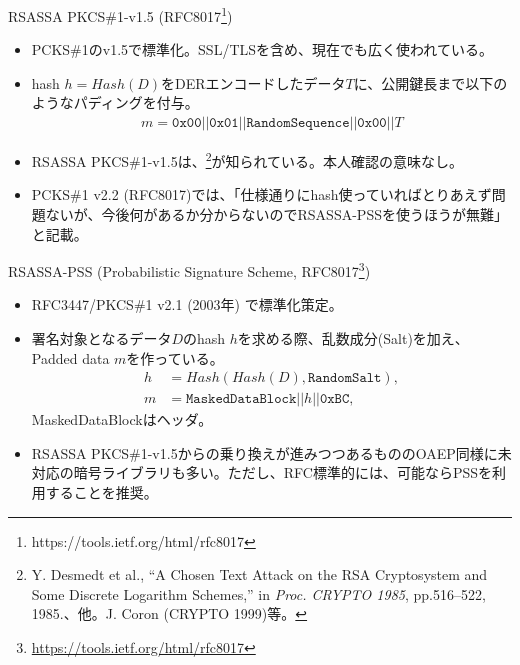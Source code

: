 \documentclass[12pt,dvipdfmx]{beamer}
\begin{document}
\begin{frame}
 \begin{block}{\small RSASSA PKCS\#1-v1.5 (RFC8017\footnote[frame]{\scriptsize https://tools.ietf.org/html/rfc8017})}
\begin{itemize}
 \item {} PCKS\#1のv1.5で標準化。SSL/TLSを含め、現在でも広く使われている。
 \item hash $h = \mathit{Hash}(D)$をDERエンコードしたデータ$T$に、公開鍵長まで以下のようなパディングを付与。
\begin{align*}
m = \mathtt{0x00 || 0x01 || RandomSequence || 0x00 ||} T
\end{align*}
 \item RSASSA PKCS\#1-v1.5は、\footnote[frame]{\scriptsize Y. Desmedt et al., ``A Chosen Text Attack on the  RSA Cryptosystem and Some Discrete Logarithm Schemes,'' in \textit{Proc. CRYPTO 1985}, pp.516--522, 1985.、他。J. Coron (CRYPTO 1999)等。}が知られている。本人確認の意味なし。
 \item PCKS\#1 v2.2 (RFC8017)では、「仕様通りにhash使っていればとりあえず問題ないが、今後何があるか分からないので\alert{RSASSA-PSSを使うほうが無難}」と記載。
\end{itemize}
\end{block}
\end{frame}

\begin{frame}
\begin{block}{\small RSASSA-PSS (Probabilistic Signature Scheme, RFC8017\footnote[frame]{\scriptsize \url{https://tools.ietf.org/html/rfc8017}})}
\begin{itemize}
 \item {} RFC3447/PKCS\#1 v2.1 (2003年) で標準化策定。
 \item 署名対象となるデータ$D$のhash $h$を求める際、乱数成分(Salt)を加え、Padded data $m$を作っている。
\begin{align*}
h &= Hash(Hash(D), \texttt{RandomSalt}),\\
m &= \texttt{MaskedDataBlock} || h || \texttt{0xBC},
\end{align*}
MaskedDataBlockはヘッダ。
 \item RSASSA PKCS\#1-v1.5からの乗り換えが進みつつあるものの\alert{OAEP同様に未対応の暗号ライブラリも多い}。ただし、RFC標準的には、可能ならPSSを利用することを推奨。
\end{itemize}
\end{block}

\end{frame}
\end{document}

